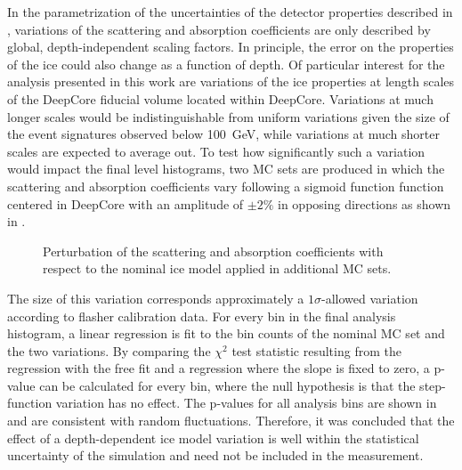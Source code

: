 In the parametrization of the uncertainties of the detector properties described in , variations of the scattering and absorption coefficients are only described by global, depth-independent scaling factors. In principle, the error on the properties of the ice could also change as a function of depth. Of particular interest for the analysis presented in this work are variations of the ice properties at length scales of the DeepCore fiducial volume located within DeepCore. Variations at much longer scales would be indistinguishable from uniform variations given the size of the event signatures observed below 100~GeV, while variations at much shorter scales are expected to average out. To test how significantly such a variation would impact the final level histograms, two MC sets are produced in which the scattering and absorption coefficients vary following a sigmoid function function centered in DeepCore with an amplitude of $\pm 2\%$ in opposing directions as shown in .
\begin{figure}
    \centering
    
    \caption{Perturbation of the scattering and absorption coefficients with respect to the nominal ice model applied in additional MC sets.}
    \label{fig:step-function-ice-model}
\end{figure}
The size of this variation corresponds approximately a $1\sigma$-allowed variation according to flasher calibration data. For every bin in the final analysis histogram, a linear regression is fit to the bin counts of the nominal MC set and the two variations. By comparing the $\chi^2$ test statistic resulting from the regression with the free fit and a regression where the slope is fixed to zero, a p-value can be calculated for every bin, where the null hypothesis is that the step-function variation has no effect. The p-values for all analysis bins are shown in  and are consistent with random fluctuations. Therefore, it was concluded that the effect of a depth-dependent ice model variation is well within the statistical uncertainty of the simulation and need not be included in the measurement.
